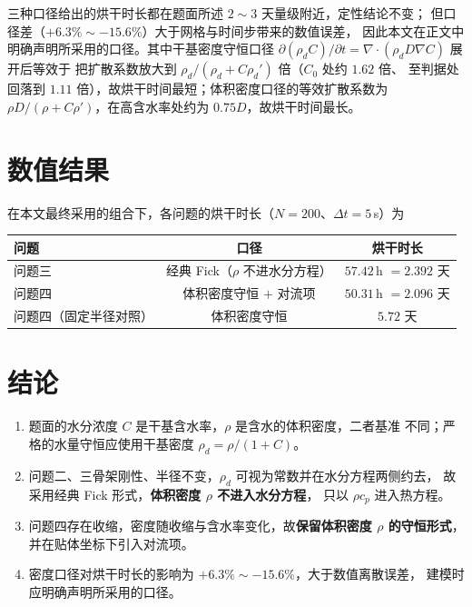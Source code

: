 \documentclass[12pt,a4paper,fontset=none]{ctexart}
\begin{document}
三种口径给出的烘干时长都在题面所述 $2\sim3$ 天量级附近，定性结论不变；
但口径差（$+6.3\%\sim-15.6\%$）大于网格与时间步带来的数值误差，
因此本文在正文中明确声明所采用的口径。其中干基密度守恒口径
$\partial(\rho_d C)/\partial t=\nabla\!\cdot\!(\rho_d D\nabla C)$ 展开后等效于
把扩散系数放大到 $\rho_d/(\rho_d+C\rho_d')$ 倍（$C_0$ 处约 $1.62$ 倍、
至判据处回落到 $1.11$ 倍），故烘干时间最短；体积密度口径的等效扩散系数为
$\rho D/(\rho+C\rho')$，在高含水率处约为 $0.75D$，故烘干时间最长。

\section{数值结果}

在本文最终采用的组合下，各问题的烘干时长（$N=200$、$\Delta t=5$\,s）为

\begin{center}
\small
\begin{tabular}{lcc}
  \toprule
  问题 & 口径 & 烘干时长 \\
  \midrule
  问题三 & 经典 Fick（$\rho$ 不进水分方程） & $57.42$\,h $=2.392$ 天 \\
  问题四 & 体积密度守恒 $+$ 对流项 & $50.31$\,h $=2.096$ 天 \\
  问题四（固定半径对照） & 体积密度守恒 & $5.72$ 天 \\
  \bottomrule
\end{tabular}
\end{center}

\section{结论}

\begin{enumerate}
  \item 题面的水分浓度 $C$ 是干基含水率，$\rho$ 是含水的体积密度，二者基准
        不同；严格的水量守恒应使用干基密度 $\rho_d=\rho/(1+C)$。
  \item 问题二、三骨架刚性、半径不变，$\rho_d$ 可视为常数并在水分方程两侧约去，
        故采用经典 Fick 形式，\textbf{体积密度 $\rho$ 不进入水分方程}，
        只以 $\rho c_p$ 进入热方程。
  \item 问题四存在收缩，密度随收缩与含水率变化，故\textbf{保留体积密度
        $\rho$ 的守恒形式}，并在贴体坐标下引入对流项。
  \item 密度口径对烘干时长的影响为 $+6.3\%\sim-15.6\%$，大于数值离散误差，
        建模时应明确声明所采用的口径。
\end{enumerate}
\end{document}
